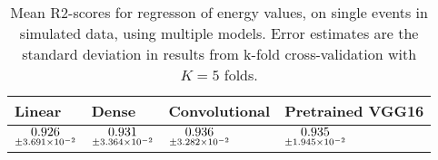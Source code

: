 \begin{table}
\centering
\caption{
Mean R2-scores for regresson of energy values, on single events in simulated data, using multiple models. 
Error estimates are the standard deviation in results from k-fold cross-validation 
with $K=5$ folds.
}
\label{tab:regression-simulated-single-energy-r2}
\begin{tabular}{llll}
\toprule
                                             Linear &                                               Dense &                                       Convolutional &                                    Pretrained VGG16 \\
\midrule
 $\underset{\num{+- 3.691e-02 }  }{\num{ 0.926 } }$ &  $\underset{\num{+- 3.364e-02 }  }{\num{ 0.931 } }$ &  $\underset{\num{+- 3.282e-02 }  }{\num{ 0.936 } }$ &  $\underset{\num{+- 1.945e-02 }  }{\num{ 0.935 } }$ \\
\bottomrule
\end{tabular}
\end{table}
